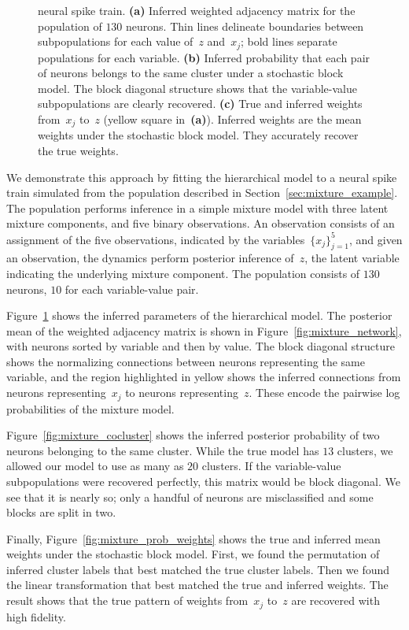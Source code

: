 \begin{figure}[t!]
{   neural spike train.
   \textbf{(a)} Inferred weighted adjacency matrix for the population
   of $130$ neurons. Thin lines delineate boundaries between subpopulations
   for each value of~$z$ and~$x_j$; bold lines separate populations for
   each variable. 
   \textbf{(b)} Inferred probability that each pair of neurons belongs to
   the same cluster under a stochastic block model.
   The block diagonal structure shows that the
   variable-value subpopulations are clearly recovered.
   \textbf{(c)} True and inferred weights
   from~$x_j$ to~$z$ (yellow square in~\textbf{(a)}). Inferred weights
   are the mean weights under the stochastic block model. They accurately
   recover the true weights.
 }
 \label{fig:mixture_recovery}
\end{figure}

We demonstrate this approach by fitting the hierarchical model to a
neural spike train simulated from the population described in
Section~\ref{sec:mixture_example}. The population performs inference
in a simple mixture model with three latent mixture components, and
five binary observations. An observation consists of an assignment of
the five observations, indicated by the variables~$\{x_j\}_{j=1}^5$,
and given an observation, the dynamics perform posterior inference
of~$z$, the latent variable indicating the underlying mixture
component. The population consists of $130$ neurons, $10$ for each
variable-value pair.



Figure~\ref{fig:mixture_recovery} shows the inferred parameters of the
hierarchical model. The posterior mean of the weighted adjacency
matrix is shown in Figure~\ref{fig:mixture_network}, with neurons sorted
by variable and then by value. The block diagonal structure shows
the normalizing connections between neurons representing the same variable,
and the region highlighted in yellow shows the inferred connections from
neurons representing~$x_j$ to neurons representing~$z$. These encode
the pairwise log probabilities of the mixture model.

Figure~\ref{fig:mixture_cocluster} shows the inferred posterior probability
of two neurons belonging to the same cluster. While the true model has
$13$ clusters, we allowed our model to use as many as $20$ clusters.
If the variable-value subpopulations
were recovered perfectly, this matrix would be block diagonal. We
see that it is nearly so; only a handful of neurons are misclassified
and some blocks are split in two.

Finally, Figure~\ref{fig:mixture_prob_weights} shows the true and inferred
mean weights under the stochastic block model. First, we found the permutation
of inferred cluster labels that best matched the true cluster labels. Then we found the
linear transformation that best matched the true and inferred weights.
The result shows that the true pattern of weights from~$x_j$ to~$z$ are
recovered with high fidelity.

